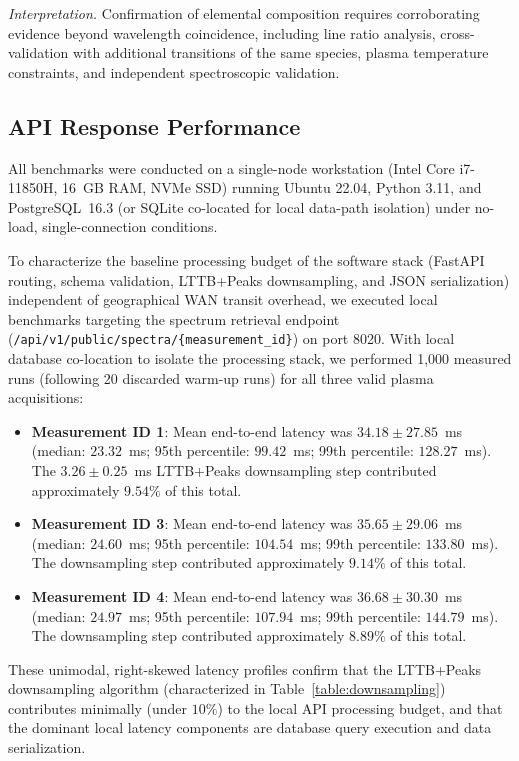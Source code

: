 \documentclass[final,5p,twocolumn,a4paper]{elsarticle}
\begin{document}
\textit{Interpretation.} Confirmation of elemental composition requires corroborating evidence beyond wavelength coincidence, including line ratio analysis, cross-validation with additional transitions of the same species, plasma temperature constraints, and independent spectroscopic validation.

\subsection{API Response Performance}

All benchmarks were conducted on a single-node workstation (Intel Core i7-11850H, 16~GB RAM, NVMe SSD) running Ubuntu 22.04, Python 3.11, and PostgreSQL~16.3 (or SQLite co-located for local data-path isolation) under no-load, single-connection conditions.

To characterize the baseline processing budget of the software stack (FastAPI routing, schema validation, LTTB+Peaks downsampling, and JSON serialization) independent of geographical WAN transit overhead, we executed local benchmarks targeting the spectrum retrieval endpoint (\texttt{/api/v1/public/spectra/\{measurement\_id\}}) on port 8020. With local database co-location to isolate the processing stack, we performed 1,000 measured runs (following 20 discarded warm-up runs) for all three valid plasma acquisitions:
\begin{itemize}
    \item \textbf{Measurement ID 1}: Mean end-to-end latency was $34.18 \pm 27.85$~ms (median: $23.32$~ms; 95th percentile: $99.42$~ms; 99th percentile: $128.27$~ms). The $3.26 \pm 0.25$~ms LTTB+Peaks downsampling step contributed approximately $9.54\%$ of this total.
    \item \textbf{Measurement ID 3}: Mean end-to-end latency was $35.65 \pm 29.06$~ms (median: $24.60$~ms; 95th percentile: $104.54$~ms; 99th percentile: $133.80$~ms). The downsampling step contributed approximately $9.14\%$ of this total.
    \item \textbf{Measurement ID 4}: Mean end-to-end latency was $36.68 \pm 30.30$~ms (median: $24.97$~ms; 95th percentile: $107.94$~ms; 99th percentile: $144.79$~ms). The downsampling step contributed approximately $8.89\%$ of this total.
\end{itemize}
These unimodal, right-skewed latency profiles confirm that the LTTB+Peaks downsampling algorithm (characterized in Table~\ref{table:downsampling}) contributes minimally (under $10\%$) to the local API processing budget, and that the dominant local latency components are database query execution and data serialization.
\end{document}
